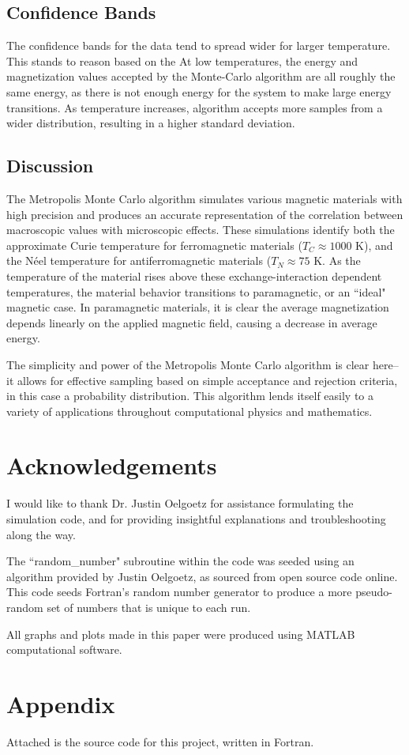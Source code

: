 \documentclass[12pt]{article}
\begin{document}
\subsection*{Confidence Bands}
The confidence bands for the data tend to spread wider for larger temperature.  This stands to reason based on the At low temperatures, the energy and magnetization values accepted by the Monte-Carlo algorithm are all roughly the same energy, as there is not enough energy for the system to make large energy transitions.  As temperature increases, algorithm accepts more samples from a wider distribution, resulting in a higher standard deviation.

\subsection*{Discussion}
The Metropolis Monte Carlo algorithm simulates various magnetic materials with high precision and produces an accurate representation of the correlation between macroscopic values with microscopic effects.  These simulations identify both the approximate Curie temperature for ferromagnetic materials ($T_C \approx 1000$ K), and the N\'{e}el temperature for antiferromagnetic materials ($T_N \approx 75$ K.  As the temperature of the material rises above these exchange-interaction dependent temperatures, the material behavior transitions to paramagnetic, or an ``ideal" magnetic case.  In paramagnetic materials, it is clear the average magnetization depends linearly on the applied magnetic field, causing a decrease in average energy.

The simplicity and power of the Metropolis Monte Carlo algorithm is clear here--it allows for effective sampling based on simple acceptance and rejection criteria, in this case a probability distribution.  This algorithm lends itself easily to a variety of applications throughout computational physics and mathematics.

\newpage
\section*{Acknowledgements}
I would like to thank Dr. Justin Oelgoetz for assistance formulating the simulation code, and for providing insightful explanations and troubleshooting along the way.

The ``random\_number" subroutine within the code was seeded using an algorithm provided by Justin Oelgoetz, as sourced from open source code online.  This code seeds Fortran's random number generator to produce a more pseudo-random set of numbers that is unique to each run.

All graphs and plots made in this paper were produced using MATLAB computational software.
\newpage
\section*{Appendix}
Attached is the source code for this project, written in Fortran.

\newpage


\end{document}
